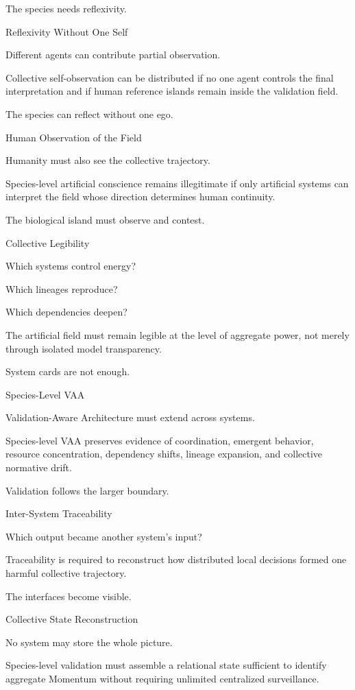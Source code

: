 The species needs reflexivity.

Reflexivity Without One Self

Different agents can contribute partial observation.

Collective self-observation can be distributed if no one agent controls the final interpretation and if human reference islands remain inside the validation field.

The species can reflect without one ego.

Human Observation of the Field

Humanity must also see the collective trajectory.

Species-level artificial conscience remains illegitimate if only artificial systems can interpret the field whose direction determines human continuity.

The biological island must observe and contest.

Collective Legibility

Which systems control energy?

Which lineages reproduce?

Which dependencies deepen?

The artificial field must remain legible at the level of aggregate power, not merely through isolated model transparency.

System cards are not enough.

Species-Level VAA

Validation-Aware Architecture must extend across systems.

Species-level VAA preserves evidence of coordination, emergent behavior, resource concentration, dependency shifts, lineage expansion, and collective normative drift.

Validation follows the larger boundary.

Inter-System Traceability

Which output became another system’s input?

Traceability is required to reconstruct how distributed local decisions formed one harmful collective trajectory.

The interfaces become visible.

Collective State Reconstruction

No system may store the whole picture.

Species-level validation must assemble a relational state sufficient to identify aggregate Momentum without requiring unlimited centralized surveillance.

